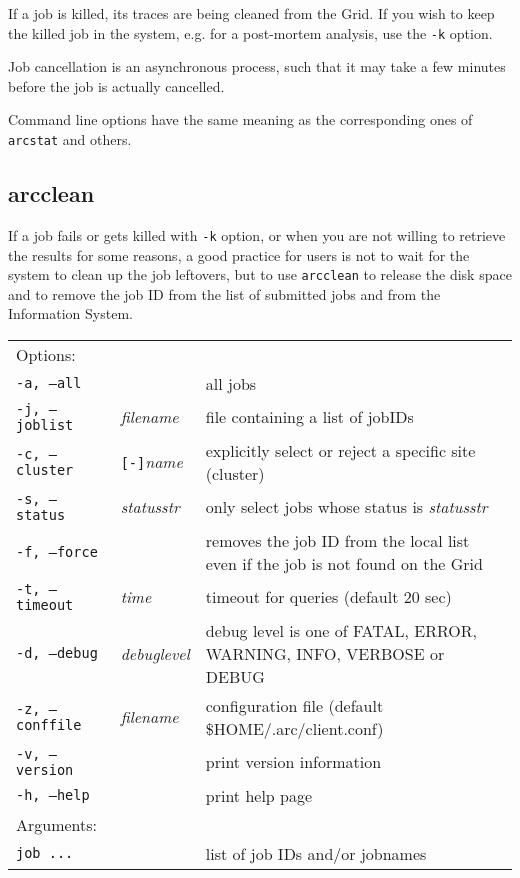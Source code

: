 If a job is killed, its traces are being cleaned from the Grid. If you wish to keep the killed job
in the system, e.g. for a post-mortem analysis, use the \verb#-k# option.

\begin{framed}
   Job cancellation is an asynchronous process, such that it
   may take a few minutes before the job is actually cancelled.
\end{framed}

Command line options have the same meaning as the corresponding ones of \verb#arcstat# and others.


\subsection{arcclean}
\label{sec:arcclean}

If a job fails or gets killed with \verb#-k# option, or when you are not willing 
to retrieve the results for some reasons, a good practice for users is not to wait 
for the system to clean up the job leftovers, but to use 
\texttt{arcclean} to release the disk 
space and to remove the job ID from the list of submitted jobs and from the Information System. 

\hspace*{0.5cm}
\begin{shaded}
\end{shaded}
\begin{longtable}{llp{8cm}}
   Options:&&\\
   \texttt{-a, --all}& & all jobs\\
   \texttt{-j, --joblist}& \textit{filename} & file containing a list of jobIDs\\
   \texttt{-c, --cluster}&\verb#[-]#\textit{name}&explicitly select or reject a specific site (cluster)\\
   \texttt{-s, --status}& \textit{statusstr} &only select jobs whose status is \textit{statusstr}\\
   \texttt{-f, --force} & & removes the job ID from the local list even if the job is not found on the Grid\\
   \texttt{-t, --timeout}& \textit{time} & timeout for queries (default 20 sec)\\
   \texttt{-d, --debug}& \textit{debuglevel}&debug level is one of  FATAL, ERROR, WARNING, INFO, VERBOSE or DEBUG\\
   \texttt{-z, --conffile}&\textit{filename}& configuration file (default {\$}HOME/.arc/client.conf)\\
   \texttt{-v, --version}& & print version information\\
   \texttt{-h, --help}& & print help page\\
   Arguments:&&\\
   \texttt{job ...} && list of job IDs and/or jobnames\\
\end{longtable}

